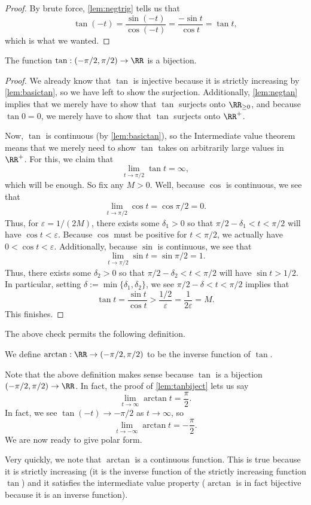 \begin{proof}
	By brute force, \autoref{lem:negtrig} tells us that
	\[\tan(-t)=\frac{\sin(-t)}{\cos(-t)}=\frac{-\sin t}{\cos t}=\tan t,\]
	which is what we wanted.
\end{proof}
\begin{lemma} \label{lem:tanbiject}
	The function $\tan:(-\pi/2,\pi/2)\to\RR$ is a bijection.
\end{lemma}
\begin{proof}
	We already know that $\tan$ is injective because it is strictly increasing by \autoref{lem:basictan}, so we have left to show the surjection. Additionally, \autoref{lem:negtan} implies that we merely have to show that $\tan$ surjects onto $\RR_{\ge0}$, and because $\tan0=0$, we merely have to show that $\tan$ surjects onto $\RR^+$.

	Now, $\tan$ is continuous (by \autoref{lem:basictan}), so the Intermediate value theorem means that we merely need to show $\tan$ takes on arbitrarily large values in $\RR^+$. For this, we claim that
	\[\lim_{t\to\pi/2}\tan t=\infty,\]
	which will be enough. So fix any $M>0$. Well, because $\cos$ is continuous, we see that
	\[\lim_{t\to\pi/2}\cos t=\cos\pi/2=0.\]
	Thus, for $\varepsilon=1/(2M)$, there exists some $\delta_1>0$ so that $\pi/2-\delta_1<t<\pi/2$ will have $\cos t<\varepsilon$. Because $\cos$ must be positive for $t<\pi/2$, we actually have $0<\cos t<\varepsilon$. Additionally, because $\sin$ is continuous, we see that
	\[\lim_{t\to\pi/2}\sin t=\sin\pi/2=1.\]
	Thus, there exists some $\delta_2>0$ so that $\pi/2-\delta_2<t<\pi/2$ will have $\sin t>1/2$. In particular, setting $\delta:=\min\{\delta_1,\delta_2\}$, we see $\pi/2-\delta<t<\pi/2$ implies that
	\[\tan t=\frac{\sin t}{\cos t}>\frac{1/2}{\varepsilon}=\frac1{2\varepsilon}=M.\]
	This finishes.
\end{proof}
The above check permits the following definition.
\begin{definition}
	We define $\arctan:\RR\to(-\pi/2,\pi/2)$ to be the inverse function of $\tan$.
\end{definition}
Note that the above definition makes sense because $\tan$ is a bijection $(-\pi/2,\pi/2)\to\RR$. In fact, the proof of \autoref{lem:tanbiject} lets us say
\[\lim_{t\to\infty}\arctan t=\frac\pi2.\]
In fact, we see $\tan(-t)\to-\pi/2$ as $t\to\infty$, so
\[\lim_{t\to-\infty}\arctan t=-\frac\pi2.\]
We are now ready to give polar form.
\begin{remark}
	Very quickly, we note that $\arctan$ is a continuous function. This is true because it is strictly increasing (it is the inverse function of the strictly increasing function $\tan$) and it satisfies the intermediate value property ($\arctan$ is in fact bijective because it is an inverse function).
\end{remark}
